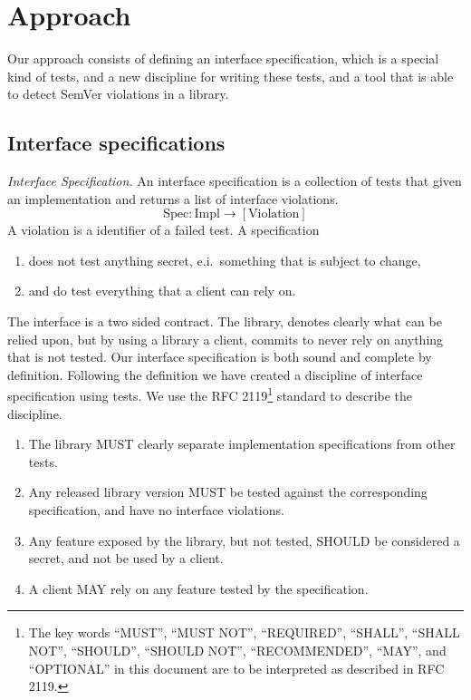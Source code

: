 \section{Approach}

Our approach consists of defining an interface specification, which is a
special kind of tests, and a new discipline for writing these tests, and a tool
that is able to detect SemVer violations in a library.

\subsection{Interface specifications}

\begin{definition}\textit{Interface Specification.}
An interface specification is a collection of tests that given an
implementation and returns a list of interface violations. 
$$\text{Spec} : \text{Impl} \to [\text{Violation}]$$
A violation is a identifier of a failed test. A specification
\begin{enumerate}
    \item does not test anything secret, e.i.\ something that is subject to change,
    \item and do test everything that a client can rely on.  
\end{enumerate}
\end{definition}

The interface is a two sided contract. The library, denotes clearly what can be
relied upon, but by using a library a client, commits to never rely on anything
that is not tested.  Our interface specification is both sound and complete by
definition.  Following the definition we have created a discipline of interface
specification using tests. We use the RFC 2119\footnote{The key words ``MUST'',
``MUST NOT'', ``REQUIRED'', ``SHALL'', ``SHALL NOT'', ``SHOULD'', ``SHOULD
NOT'', ``RECOMMENDED'',  ``MAY'', and ``OPTIONAL'' in this document are to be
interpreted as described in RFC 2119\cite{rfc2119}.} standard to describe the
discipline.

\begin{enumerate}
    \item The library MUST clearly separate implementation specifications from
    other tests.
    \item Any released library version MUST be tested against the corresponding
    specification, and have no interface violations.
    \item Any feature exposed by the library, but not tested, SHOULD be
    considered a secret, and not be used by a client.
    \item A client MAY rely on any feature tested by the specification.
\end{enumerate}

